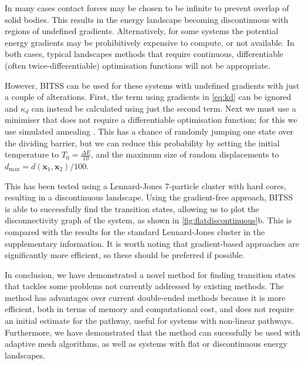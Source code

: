 \documentclass[aps,twocolumn]{revtex4-1}
\begin{document}
\topic In many cases contact forces may be chosen to be infinite to prevent overlap of solid bodies.
This results in the energy landscape becoming discontinuous with regions of undefined gradients.
Alternatively, for some systems the potential energy gradients may be prohibitively expensive to compute, or not available.
In both cases, typical landscapes methods that require continuous, differentiable (often twice-differentiable) optimisation functions will not be appropriate.

\topic However, BITSS can be used for these systems with undefined gradients with just a couple of alterations.
First, the term using gradients in \cref{eq:kd} can be ignored and $\kappa_d$ can instead be calculated using just the second term.
Next we must use a minimiser that does not require a differentiable optimisation function; for this we use simulated annealing \cite{Kirkpatrick1983}.
This has a chance of randomly jumping one state over the dividing barrier, but we can reduce this probability by setting the initial temperature to $T_0 = \frac{\Delta E}{10}$, and the maximum size of random displacements to $d_\text{max} = d(\bm{x}_1, \bm{x}_2) / 100$.

\topic This has been tested using a Lennard-Jones 7-particle cluster with hard cores, resulting in a discontinuous landscape.
Using the gradient-free approach, BITSS is able to successfully find the transition states, allowing us to plot the disconnectivity graph of the system, as shown in \cref{fig:flatdiscontinuous}b.
This is compared with the results for the standard Lennard-Jones cluster in the supplementary information.
It is worth noting that gradient-based approaches are significantly more efficient, so these should be preferred if possible.


\topic In conclusion, we have demonstrated a novel method for finding transition states that tackles some problems not currently addressed by existing methods.
The method has advantages over current double-ended methods because it is more efficient, both in terms of memory and computational cost, and does not require an initial estimate for the pathway, useful for systems with non-linear pathways.
Furthermore, we have demonstrated that the method can sucessfully be used with adaptive mesh algorithms, as well as systems with flat or discontinuous energy landscapes.




\end{document}
